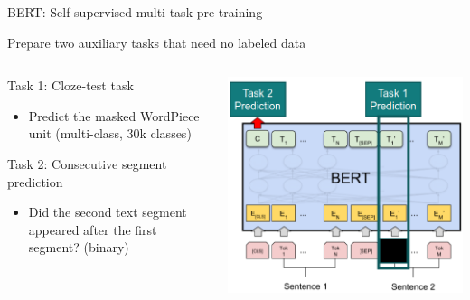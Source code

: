 \documentclass[12pt,aspectratio=169,handout]{beamer}
\begin{document}
\begin{frame}{BERT: Self-supervised multi-task pre-training}
	
Prepare two auxiliary tasks that need no labeled data
	
\begin{columns}
\hspace*{-9em}\begin{column}{0.48\textwidth}
\begin{small}
\noindent Task 1: Cloze-test task
\begin{itemize}
	\item 	Predict the masked WordPiece unit (multi-class, 30k classes)
\end{itemize}


Task 2: Consecutive segment prediction

\begin{itemize}
	\item Did the second text segment appeared after the first segment? (binary)
\end{itemize}
\end{small}
\end{column}
\hspace*{-9.5em}\begin{column}{0.48\textwidth}
\includegraphics[width=\linewidth]{img/bert-pretraining.png}
\end{column}
\end{columns}

\end{frame}
\end{document}

